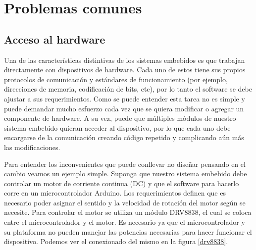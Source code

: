 



%
%
\chapter{Problemas comunes}

\section{Acceso al hardware}
\label{Accesoalhardware}
Una de las características distintivas de los sistemas embebidos es que trabajan directamente con dispositivos de hardware. Cada uno de estos tiene sus propios protocolos de comunicación y estándares de funcionamiento (por ejemplo, direcciones de memoria, codificación de bits, etc), por lo tanto el software se debe ajustar a sus requerimientos. Como se puede entender esta tarea no es simple y puede demandar mucho esfuerzo cada vez que se quiera modificar o agregar un componente de hardware. A su vez, puede que múltiples módulos de nuestro sistema embebido quieran acceder al dispositivo, por lo que cada uno debe encargarse de la comunicación creando código repetido y complicando aún más las modificaciones. 

Para entender los inconvenientes que puede conllevar no diseñar pensando en el cambio veamos un ejemplo simple. Suponga que nuestro sistema embebido debe controlar un motor de corriente continua (\gls{DC}) y que el software para hacerlo corre en un microcontrolador Arduino. Los requerimientos definen que es necesario poder asignar el sentido y la velocidad de rotación del motor según se necesite. Para controlar el motor se utiliza un módulo \gls{DRV8838}, el cual se coloca entre el microcontrolador y el motor. Es necesario ya que el microcontrolador y su plataforma no pueden manejar las potencias necesarias para hacer funcionar el dispositivo. Podemos ver el conexionado del mismo en la figura \ref{drv8838}.

